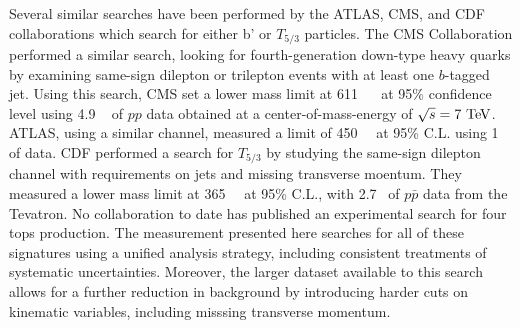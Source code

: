 Several similar searches have been performed by the ATLAS, CMS, and CDF collaborations which search for either b' or $T_{5/3}$ particles.
The CMS Collaboration performed a similar search, looking for fourth-generation down-type heavy quarks by examining same-sign dilepton or trilepton events with at least one $b$-tagged jet.
Using this search, CMS set a lower mass limit at 611~\GeV{} ~\cite{Chatrchyan:2012yea} at 95\% confidence level using 4.9 ~\ifb{} of $pp$ data obtained at a center-of-mass-energy of $\sqrt{s}=7 \TeV$.
ATLAS, using a similar channel, measured a limit of 450~\GeV{}~\cite{Collaboration:2012vs} at 95\% C.L. using 1~\ifb{} of data.
CDF performed a search for $T_{5/3}$ by studying the same-sign dilepton channel with requirements on jets and missing transverse moentum.
They measured a lower mass limit at 365~\GeV{}~\cite{Aaltonen:bprime_singlelepton} at 95\% C.L., with 2.7~\ifb{} of $p\bar{p}$ data from the Tevatron.  
No collaboration to date has published an experimental search for four tops production.
The measurement presented here searches for all of these signatures using a unified analysis strategy, including consistent treatments of systematic uncertainties.
Moreover, the larger dataset available to this search allows for a further reduction in background by introducing harder cuts on kinematic variables, including misssing transverse momentum.





